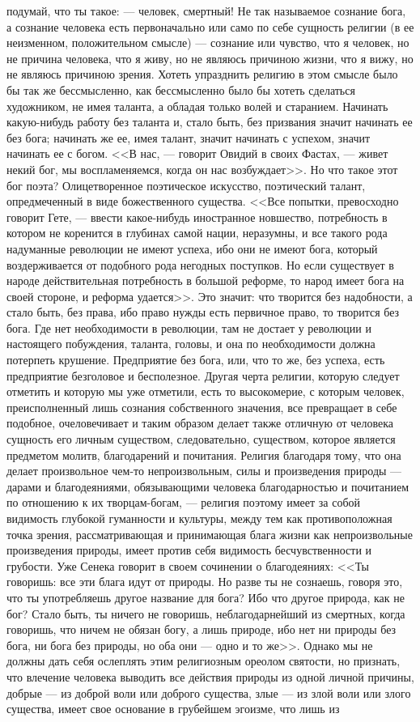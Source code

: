 \documentclass[12pt]{article}
\begin{document}
подумай, что ты такое: --- человек, смертный! Не так называемое сознание бога, а сознание человека есть первоначально или само по себе сущность религии (в ее неизменном, положительном смысле) --- сознание или чувство, что я человек, но не причина человека, что я живу, но не являюсь причиною жизни, что я вижу, но не являюсь причиною зрения. Хотеть упразднить религию в этом смысле было бы так же бессмысленно, как бессмысленно было бы хотеть сделаться художником, не имея таланта, а обладая только волей и старанием. Начинать какую-нибудь работу без таланта и, стало быть, без призвания значит начинать ее без бога; начинать же ее, имея талант, значит начинать с успехом, значит начинать ее с богом. <<В нас, --- говорит Овидий в своих Фастах, --- живет некий бог, мы воспламеняемся, когда он нас возбуждает>>. Но что такое этот бог поэта? Олицетворенное поэтическое искусство, поэтический талант, опредмеченный в виде божественного существа. <<Все попытки, превосходно говорит Гете, --- ввести какое-нибудь иностранное новшество, потребность в котором не коренится в глубинах самой нации, неразумны, и все такого рода надуманные революции не имеют успеха, ибо они не имеют бога, который воздерживается от подобного рода негодных поступков. Но если существует в народе действительная потребность в большой реформе, то народ имеет бога на своей стороне, и реформа удается>>. Это значит: что творится без надобности, а стало быть, без права, ибо право нужды есть первичное право, то творится без бога. Где нет необходимости в революции, там не достает у революции и настоящего побуждения, таланта, головы, и она по необходимости должна потерпеть крушение. Предприятие без бога, или, что то же, без успеха, есть предприятие безголовое и бесполезное. Другая черта религии, которую следует отметить и которую мы уже отметили, есть то высокомерие, с которым человек, преисполненный лишь сознания собственного значения, все превращает в себе подобное, очеловечивает и таким образом делает также отличную от человека сущность его личным существом, следовательно, существом, которое является предметом молитв, благодарений и почитания. Религия благодаря тому, что она делает произвольное чем-то непроизвольным, силы и произведения природы --- дарами и благодеяниями, обязывающими человека благодарностью и почитанием по отношению к их творцам-богам, --- религия поэтому имеет за собой видимость глубокой гуманности и культуры, между тем как противоположная точка зрения, рассматривающая и принимающая блага жизни как непроизвольные произведения природы, имеет против себя видимость бесчувственности и грубости. Уже Сенека говорит в своем сочинении о благодеяниях: <<Ты говоришь: все эти блага идут от природы. Но разве ты не сознаешь, говоря это, что ты употребляешь другое название для бога? Ибо что другое природа, как не бог? Стало быть, ты ничего не говоришь, неблагодарнейший из смертных, когда говоришь, что ничем не обязан богу, а лишь природе, ибо нет ни природы без бога, ни бога без природы, но оба они --- одно и то же>>. Однако мы не должны дать себя ослеплять этим религиозным ореолом святости, но признать, что влечение человека выводить все действия природы из одной личной причины, добрые --- из доброй воли или доброго существа, злые --- из злой воли или злого существа, имеет свое основание в грубейшем эгоизме, что лишь из 
\end{document}
